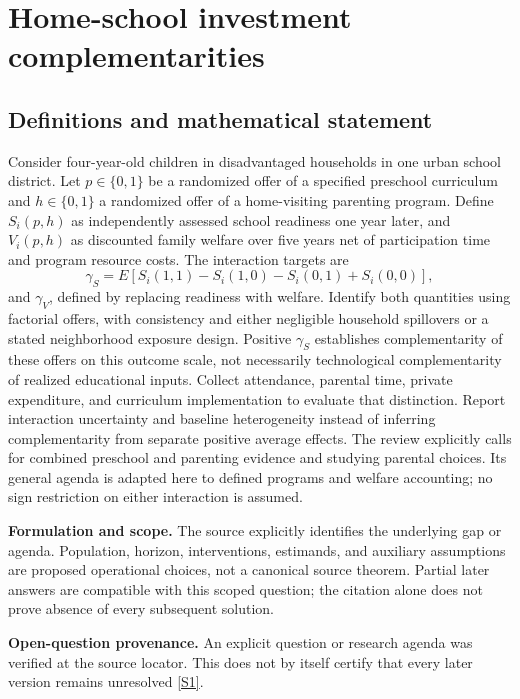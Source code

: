 \documentclass[11pt]{article}
\newcommand{\sref}[2]{\hyperlink{source:#1:#2}{[S#2]}}
\begin{document}
\section*{Home-school investment complementarities}\label{30007733}
\subsection{Definitions and mathematical statement}
Consider four-year-old children in disadvantaged households in one urban school district. Let \(p\in\{0,1\}\) be a randomized offer of a specified preschool curriculum and \(h\in\{0,1\}\) a randomized offer of a home-visiting parenting program. Define \(S_i(p,h)\) as independently assessed school readiness one year later, and \(V_i(p,h)\) as discounted family welfare over five years net of participation time and program resource costs. The interaction targets are
\[\gamma_S=E[S_i(1,1)-S_i(1,0)-S_i(0,1)+S_i(0,0)],\]
and \(\gamma_V\), defined by replacing readiness with welfare. Identify both quantities using factorial offers, with consistency and either negligible household spillovers or a stated neighborhood exposure design. Positive \(\gamma_S\) establishes complementarity of these offers on this outcome scale, not necessarily technological complementarity of realized educational inputs. Collect attendance, parental time, private expenditure, and curriculum implementation to evaluate that distinction. Report interaction uncertainty and baseline heterogeneity instead of inferring complementarity from separate positive average effects. The review explicitly calls for combined preschool and parenting evidence and studying parental choices. Its general agenda is adapted here to defined programs and welfare accounting; no sign restriction on either interaction is assumed.

\par\textbf{Formulation and scope.} The source explicitly identifies the underlying gap or agenda. Population, horizon, interventions, estimands, and auxiliary assumptions are proposed operational choices, not a canonical source theorem. Partial later answers are compatible with this scoped question; the citation alone does not prove absence of every subsequent solution.

\par\textbf{Open-question provenance.} An explicit question or research agenda was verified at the source locator. This does not by itself certify that every later version remains unresolved \sref{30007733}{1}.
\end{document}
